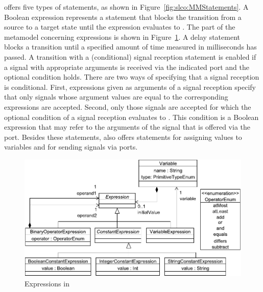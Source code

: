 \SLCO offers five types of statements, as shown in Figure~\ref{fig:slco:MMStatements}.
A Boolean expression represents a statement that blocks the transition from a source to a target state until the expression evaluates to \SLCOTrue.
The part of the \SLCO metamodel concerning expressions is shown in Figure~\ref{fig:slco:MMExp}.
A delay statement blocks a transition until a specified amount of time measured in milliseconds has passed.
A transition with a (conditional) signal reception statement is enabled if a signal with appropriate arguments is received via the indicated port and the optional condition holds.
There are two ways of specifying that a signal reception is conditional.
First, expressions given as arguments of a signal reception specify that only signals whose argument values are equal to the corresponding expressions are accepted.
Second, only those signals are accepted for which the optional condition of a signal reception evaluates to \SLCOTrue.
This condition is a Boolean expression that may refer to the arguments of the signal that is offered via the port.
Besides these statements, \SLCO also offers statements for assigning values to variables and for sending signals via ports.

\begin{figure}[hbt]
  \centering
  \includegraphics[scale=0.6]{slco/figs/metamodel/mm_slco_exp}
  \caption{Expressions in \SLCO}
  \label{fig:slco:MMExp}
\end{figure}

